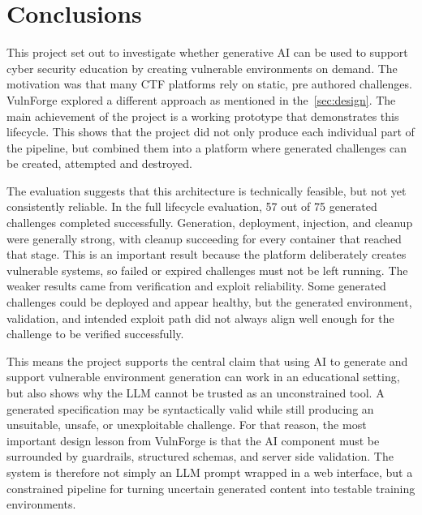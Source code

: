%


\section{Conclusions}\label{sec:conclusions}

This project set out to investigate whether generative AI can be used to support cyber security education by creating vulnerable environments on demand. The motivation was that many CTF platforms rely on static, pre authored challenges. VulnForge explored a different approach as mentioned in the~\ref{sec:design}. The main achievement of the project is a working prototype that demonstrates this lifecycle. This shows that the project did not only produce each individual part of the pipeline, but combined them into a platform where generated challenges can be created, attempted and destroyed.

The evaluation suggests that this architecture is technically feasible, but not yet consistently reliable. In the full lifecycle evaluation, 57 out of 75 generated challenges completed successfully. Generation, deployment, injection, and cleanup were generally strong, with cleanup succeeding for every container that reached that stage. This is an important result because the platform deliberately creates vulnerable systems, so failed or expired challenges must not be left running. The weaker results came from verification and exploit reliability. Some generated challenges could be deployed and appear healthy, but the generated environment, validation, and intended exploit path did not always align well enough for the challenge to be verified successfully.

This means the project supports the central claim that using AI to generate and support vulnerable environment generation can work in an educational setting, but also shows why the LLM cannot be trusted as an unconstrained tool. A generated specification may be syntactically valid while still producing an unsuitable, unsafe, or unexploitable challenge. For that reason, the most important design lesson from VulnForge is that the AI component must be surrounded by guardrails, structured schemas, and server side validation. The system is therefore not simply an LLM prompt wrapped in a web interface, but a constrained pipeline for turning uncertain generated content into testable training environments.

